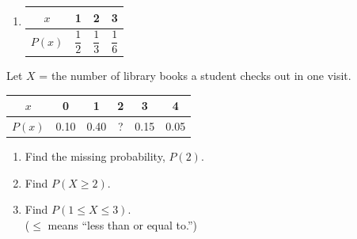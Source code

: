 \documentclass[11pt]{article}
\begin{document}
\begin{enumerate}
\begin{minipage}[t]{0.48\linewidth}
\begin{enumerate}[start=3]
  \vspace{0.3em}
  \work{3em}
\end{enumerate}
\end{minipage}\hfill
\begin{minipage}[t]{0.48\linewidth}\vspace{0pt}\raggedright
\begin{enumerate}[start=4]
  \item {\renewcommand{\arraystretch}{2.2}\begin{tabular}[t]{|c|c|c|c|}\hline $x$ & 1 & 2 & 3\\ \hline $P(x)$ & $\dfrac{1}{2}$ & $\dfrac{1}{3}$ & $\dfrac{1}{6}$\\ \hline\end{tabular}}

  \vspace{0.3em}
  \work{3em}
\end{enumerate}
\end{minipage}

\vspace{1em}
Let $X$ = the number of library books a student checks out in one visit.

\vspace{0.3em}
\begin{center}
\begin{tabular}{|c|c|c|c|c|c|}\hline
$x$ & 0 & 1 & 2 & 3 & 4\\ \hline
$P(x)$ & 0.10 & 0.40 & \;?\; & 0.15 & 0.05\\ \hline
\end{tabular}
\end{center}

\begin{minipage}[t]{0.47\linewidth}\vspace{0pt}\raggedright
\begin{enumerate}[start=5,itemsep=1em]
  \item Find the missing probability, $P(2)$.

  \work{3em}
  \item Find $P(X \ge 2)$.

  \work{2.5em}
  \item Find $P(1 \le X \le 3)$.\\ ($\le$ means ``less than or equal to.'')


\end{enumerate}
\end{minipage}
\end{enumerate}
\end{document}
